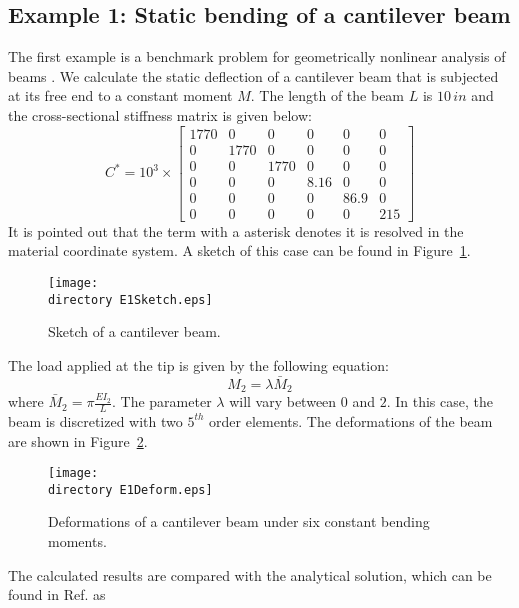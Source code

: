 \subsection{Example 1: Static bending of a cantilever beam}

The first example is a benchmark problem for geometrically nonlinear
analysis of beams \cite{Simo1985,Xiao-Zhong:2012}. We calculate the static
deflection of a cantilever beam that is subjected at its free end to
a constant moment $M$.  The length of the beam $L$ is $10\,in$ and the cross-sectional stiffness 
matrix is given below:
\begin{equation}
    \label{StifE1}
    C^* = 10^3 \times \begin{bmatrix}
	1770 & 0    & 0    & 0    & 0    & 0   \\
	 0    & 1770 & 0    & 0    & 0    & 0   \\
	 0   &   0   & 1770 & 0    & 0    & 0   \\
	 0   &   0   &  0    & 8.16 & 0    & 0   \\
	 0   &   0   &  0    &  0    & 86.9 & 0   \\
	 0   &   0   &  0    &  0    &   0   & 215
\end{bmatrix}
\end{equation}
It is pointed out that the term with a asterisk denotes it is resolved in the material coordinate system. A sketch of this case can be found in Figure~\ref{E1Sketch}.
\begin{figure}
    \centering
    \texttt{[image: \\directory E1Sketch.eps]}
    \caption{Sketch of a cantilever beam.}
    \label{E1Sketch}
\end{figure} 
The load applied at the tip is given by the following equation:
\begin{equation}
    \label{E1Load}
    M_2 = \lambda \bar{M}_2
\end{equation}
where $\bar{M}_2 = \pi \frac{EI_2}{L}$. The parameter $\lambda$ will vary between $0$ and $2$. In 
this case, the beam is discretized with two $5^{th}$ order elements. The deformations of the beam are shown in Figure~\ref{E1Deform}.
\begin{figure}
    \centering
    \texttt{[image: \\directory E1Deform.eps]}
    \caption{Deformations of a cantilever beam under six constant
bending moments. }
    \label{E1Deform}
\end{figure}
The calculated results are compared with the analytical solution, which can be found in Ref.\cite{Mayo-etal:2004} as
